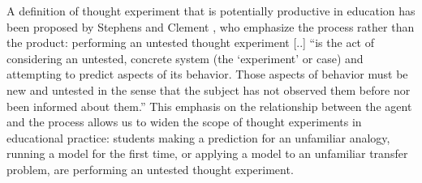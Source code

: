 \documentclass[twocolumn,secnumarabic,amssymb, nobibnotes, aps, prd, nofootinbib]{revtex4-2}
\begin{document}
A definition of thought experiment that is potentially productive in education has been proposed by Stephens and Clement \cite{Stephens2012}, who emphasize the process rather than the product: performing an untested thought experiment [..] ``is the act of considering an untested, concrete system (the `experiment' or case) and attempting to predict aspects of its behavior. Those aspects of behavior must be new and untested in the sense that the subject has not observed them before nor been informed about them.'' This emphasis on the relationship between the agent and the process allows us to widen the scope of thought experiments in educational practice: students making a prediction for an unfamiliar analogy, running a model for the first time, or applying a model to an unfamiliar transfer problem, are performing an untested thought experiment.
\end{document}
